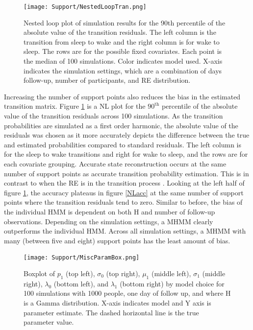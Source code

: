 \documentclass{article}
\begin{document}
\begin{figure}
    \texttt{[image: Support/NestedLoopTran.png]}
    \centering
    \caption{Nested loop plot of simulation results for the 90th percentile of the absolute value of the transition residuals. The left column is the transition from sleep to wake and the right column is for wake to sleep. The rows are for the possible fixed covariates. Each point is the median of 100 simulations. Color indicates model used. X-axis indicates the simulation settings, which are a combination of days follow-up, number of participants, and RE distribution.}
    \label{NLtran}
\end{figure}

Increasing the number of support points also reduces the bias in the estimated transition matrix. Figure \ref{NLtran} is a NL plot for the $90^{\text{th}}$ percentile of the absolute value of the transition residuals across 100 simulations. As the transition probabilities are simulated as a first order harmonic, the absolute value of the residuals was chosen as it more accurately depicts the difference between the true and estimated probabilities compared to standard residuals. The left column is for the sleep to wake transitions and right for wake to sleep, and the rows are for each covariate grouping. Accurate state reconstruction occurs at the same number of support points as accurate transition probability estimation. This is in contrast to when the RE is in the transition process \cite{mcclintock2021}. Looking at the left half of figure \ref{NLtran}, the accuracy plateaus in figure \ref{NLacc} at the same number of support points where the transition residuals tend to zero. Similar to before, the bias of the individual HMM is dependent on both H and number of follow-up observations. Depending on the simulation settings, a MHMM clearly outperforms the individual HMM. Across all simulation settings, a MHMM with many (between five and eight) support points has the least amount of bias.

\begin{figure}
    \texttt{[image: Support/MiscParamBox.png]}
    \centering
    \caption{Boxplot of $p_1$ (top left), $\sigma_0$ (top right), $\mu_1$ (middle left), $\sigma_1$ (middle right), $\lambda_0$ (bottom left), and $\lambda_1$ (bottom right) by model choice for 100 simulations with 1000 people, one day of follow up, and where H is a Gamma distribution. X-axis indicates model and Y axis is parameter estimate. The dashed horizontal line is the true parameter value.}
    \label{miscParam}
\end{figure}
\end{document}
